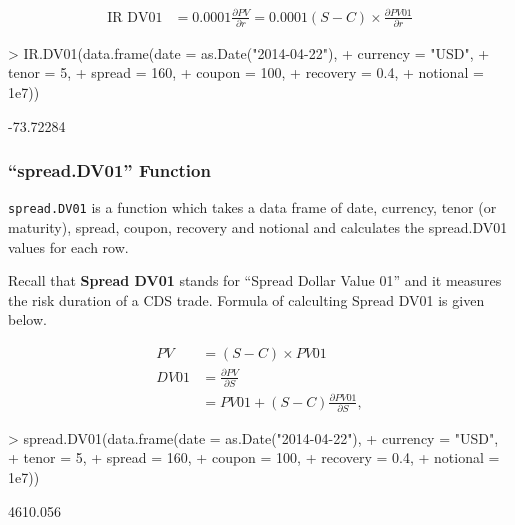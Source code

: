 \documentclass{jss}
\begin{document}
\begin{align*}
  \text{IR DV01} &= 0.0001 \frac{\partial PV}{\partial r} = 0.0001 (S - C) \times \frac{\partial PV01}{\partial r}
\end{align*}


\begin{Schunk}
\begin{Sinput}
> IR.DV01(data.frame(date     = as.Date("2014-04-22"),
+                    currency = "USD",
+                    tenor    = 5,
+                    spread   = 160,
+                    coupon   = 100,
+                    recovery = 0.4,
+                    notional = 1e7))
\end{Sinput}
\begin{Soutput}
[1] -73.72284
\end{Soutput}
\end{Schunk}


\subsubsection{``spread.DV01'' Function}

\texttt{spread.DV01} is a function which takes a data frame of date, currency, tenor (or maturity), spread, coupon, recovery and notional and calculates the spread.DV01 values for each row.

Recall that \textbf{Spread DV01} stands for ``Spread Dollar Value 01'' and it measures the risk duration of a CDS trade. Formula of calculting Spread DV01 is given below.

\begin{align*}
  PV &= (S - C) \times PV01 \\
  DV01 &= \frac{\partial PV}{\partial S} \\
  &= PV01 + (S - C) \frac{\partial PV01}{\partial S},
\end{align*}

\begin{Schunk}
\begin{Sinput}
> spread.DV01(data.frame(date     = as.Date("2014-04-22"),
+                        currency = "USD",
+                        tenor    = 5,
+                        spread   = 160,
+                        coupon   = 100,
+                        recovery = 0.4,
+                        notional = 1e7))
\end{Sinput}
\begin{Soutput}
[1] 4610.056
\end{Soutput}
\end{Schunk}
\end{document}
